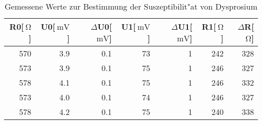 \begin{table}[!h]
\begin{center}
\begin{tabular}{|r|r|r|r|r|r|r|}
\hline
R0[$\SI{}{\ohm}$] & U0[$\SI{}{\milli\volt}$] & $\Delta$U0[$\SI{}{\milli\volt}$] & U1[$\SI{}{\milli\volt}$] & $\Delta$U1[$\SI{}{\milli\volt}$] & R1[$\SI{}{\ohm}$] & $\Delta$R[$\SI{}{\ohm}$]\\
\hline
\hline

570 & 3.9 & 0.1 & 73 & 1 & 242 & 328\\
573 & 3.9 & 0.1 & 75 & 1 & 246 & 327\\
578 & 4.1 & 0.1 & 75 & 1 & 246 & 332\\
573 & 4.0 & 0.1 & 74 & 1 & 246 & 327\\
578 & 4.2 & 0.1 & 75 & 1 & 240 & 338\\

\hline
\end{tabular}
\caption[Messwerte zu Aufgabenteil b]{Gemessene Werte zur Bestimmung der Suszeptibilit"at von Dysprosium}
\label{tabelle:aufgabe_b_Dy}
\end{center}
\end{table}